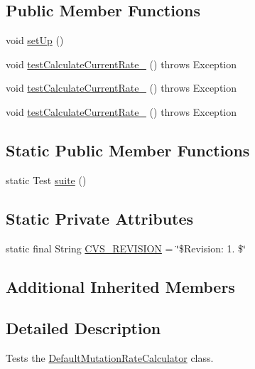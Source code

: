 \subsection*{Public Member Functions}
\begin{DoxyCompactItemize}
\item 
void \hyperlink{classorg_1_1jgap_1_1impl_1_1_default_mutation_rate_calculator_test_a17868fbd79f0e5064dee0d75663d2e9c}{set\-Up} ()
\item 
void \hyperlink{classorg_1_1jgap_1_1impl_1_1_default_mutation_rate_calculator_test_a298e1409186a29fdc09ba978ca4d5337}{test\-Calculate\-Current\-Rate\-\_} ()  throws Exception 
\item 
void \hyperlink{classorg_1_1jgap_1_1impl_1_1_default_mutation_rate_calculator_test_af2edfcb91509206e4e638808e9e1a673}{test\-Calculate\-Current\-Rate\-\_} ()  throws Exception 
\item 
void \hyperlink{classorg_1_1jgap_1_1impl_1_1_default_mutation_rate_calculator_test_af3716f368e73d01c5347b0fa886ab3d1}{test\-Calculate\-Current\-Rate\-\_} ()  throws Exception 
\end{DoxyCompactItemize}
\subsection*{Static Public Member Functions}
\begin{DoxyCompactItemize}
\item 
static Test \hyperlink{classorg_1_1jgap_1_1impl_1_1_default_mutation_rate_calculator_test_a2c455ba0d610205d1b2f6e4500048d2d}{suite} ()
\end{DoxyCompactItemize}
\subsection*{Static Private Attributes}
\begin{DoxyCompactItemize}
\item 
static final String \hyperlink{classorg_1_1jgap_1_1impl_1_1_default_mutation_rate_calculator_test_a94e35cd33b612e98299812fc6086f80c}{C\-V\-S\-\_\-\-R\-E\-V\-I\-S\-I\-O\-N} = \char`\"{}\$Revision\-: 1. \$\char`\"{}
\end{DoxyCompactItemize}
\subsection*{Additional Inherited Members}


\subsection{Detailed Description}
Tests the \hyperlink{classorg_1_1jgap_1_1impl_1_1_default_mutation_rate_calculator}{Default\-Mutation\-Rate\-Calculator} class.

